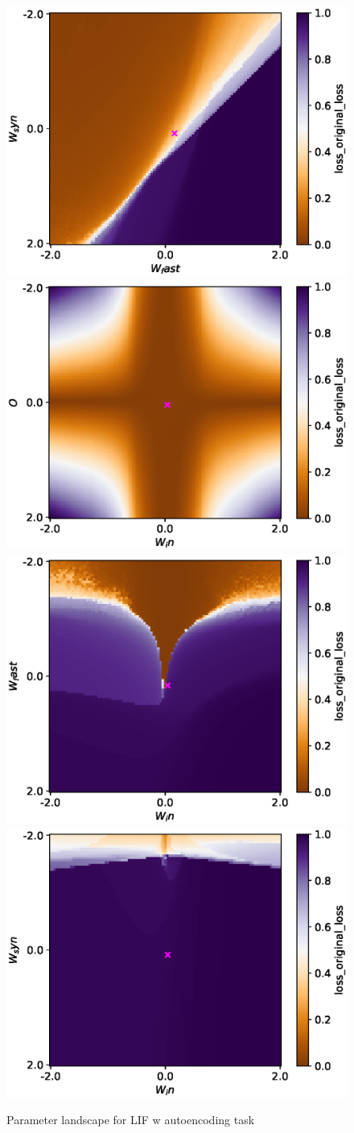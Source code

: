 \documentclass[mphil,deptreport,ianc]{infthesis} %
\begin{document}
\begin{figure}
    \centering
    \includegraphics[width=0.49\columnwidth]{figures/param_landscape_heatmaps/gating/LIF/test_export_2d_heatmap_N_4_loss_original_loss_W_fast_W_syn.eps}
    \includegraphics[width=0.49\columnwidth]{figures/param_landscape_heatmaps/gating/LIF/test_export_2d_heatmap_N_4_loss_original_loss_W_in_O.eps}
    \includegraphics[width=0.49\columnwidth]{figures/param_landscape_heatmaps/gating/LIF/test_export_2d_heatmap_N_4_loss_original_loss_W_in_W_fast.eps}
    \includegraphics[width=0.49\columnwidth]{figures/param_landscape_heatmaps/gating/LIF/test_export_2d_heatmap_N_4_loss_original_loss_W_in_W_syn.eps}
    \caption{Parameter landscape for LIF w autoencoding task}
    \label{fig:p_landscape_LIF_autoencoding}
\end{figure}
\end{document}
